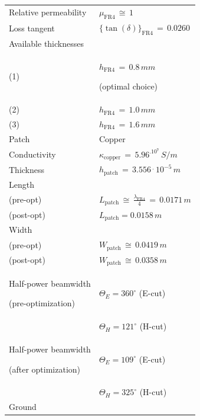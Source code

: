 \documentclass[10 pt,a4paper,twocolumn]{article}
\begin{document}
{\begin{table}[t!]
\begin{center}
{\begin{tabular}{|m{4.2cm}|m{4.2cm}|}
				Relative permeability & $\mu_{\operatorname{FR4}}\,\cong\,1$\\
				
				Loss tangent & $\{\tan(\delta)\}_{\operatorname{FR4}}\,=\,0.0260$\\
				\hline 
				
			Available thicknesses &\\ 
				(1) & $h_{\operatorname{FR4}}\,=\,0.8\,mm$ 
				
				(optimal choice)\\
				(2) & $h_{\operatorname{FR4}}\,=\,1.0\,mm$ \\
				(3) & $h_{\operatorname{FR4}}\,=\,1.6\,mm$ \\
				\hline
				\cellcolor{flax} Patch
				  & \cellcolor{flax} Copper \\
				\hline
			Conductivity & $\kappa_{\operatorname{copper}}\,=\,5.96^.10^7\,S/m$ \\
			
			Thickness & $h_{\operatorname{patch}}\,=\,3.556\,^.\,10^{-5}\,m$\\
			\hline 
			Length & \\
			(pre-opt) & $L_{\operatorname{patch}}\,\cong\,\frac{\lambda_{\operatorname{FR4}}}{4}\,=\,0.0171\,m$\\
			(post-opt) & $L_{\operatorname{patch}}=0.0158\,m$\\
			\hline
			Width & \\
			(pre-opt) & $W_{\operatorname{patch}}\,\cong\,0.0419\,m$\\
			(post-opt) & $W_{\operatorname{patch}}\,\cong\,0.0358\,m$\\
		\hline
			
			Half-power beamwidth 
			
			(pre-optimization) & 
		$\Theta_E=360^\circ$ (E-cut) \\
		& $\Theta_H=121^\circ$ (H-cut)\\
		Half-power beamwidth
	
	(after optimization) & $\Theta_E=109^\circ$ (E-cut)\\
	& $\Theta_H=325^\circ$ (H-cut)\\
			\hline
			\cellcolor{flax}Ground 
			

\end{tabular}}
\end{center}
\end{table}}
\end{document}
